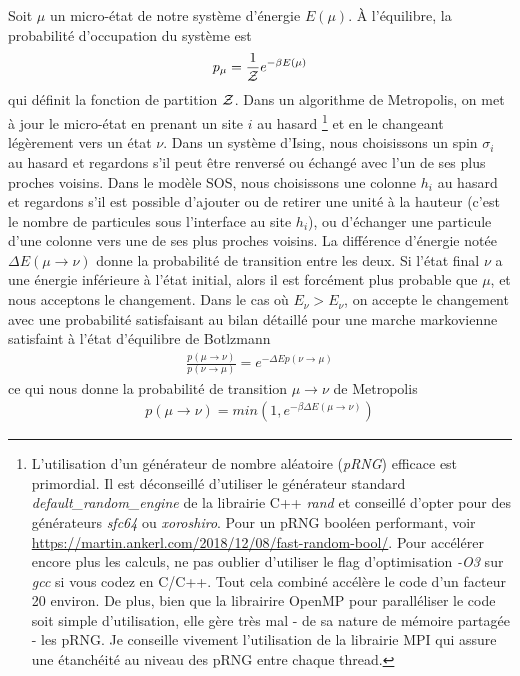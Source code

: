 Soit $\mu$ un micro-état de notre système d'énergie $E(\mu)$. À l'équilibre\cite{gibbs}, la probabilité d'occupation du système est
\begin{align}
	p_\mu = \frac{1}{\mathcal{Z}} e^{-\beta E(\mu)}
\end{align}
qui définit la fonction de partition $\mathcal{Z}$. Dans un algorithme de Metropolis, on met à jour le micro-état en prenant un site $i$ au hasard
\footnote{L'utilisation d'un générateur de nombre aléatoire (\textit{pRNG}) efficace est primordial. Il est déconseillé d'utiliser le générateur standard \textit{default\_random\_engine} de la librairie C++ \textit{rand} et conseillé d'opter pour des générateurs \textit{sfc64} ou \textit{xoroshiro}. Pour un pRNG booléen performant, voir \url{https://martin.ankerl.com/2018/12/08/fast-random-bool/}. Pour accélérer encore plus les calculs, ne pas oublier d'utiliser le flag d'optimisation \textit{-O3}  sur \textit{gcc} si vous codez en C/C++. Tout cela combiné accélère le code d'un facteur 20 environ. \newline
De plus, bien que la librairire OpenMP pour paralléliser le code soit simple d'utilisation, elle gère très mal - de sa nature de mémoire partagée - les pRNG. Je conseille vivement l'utilisation de la librairie MPI qui assure une étanchéité au niveau des pRNG entre chaque thread.} 
et en le changeant légèrement vers un état $\nu$. Dans un système d'Ising, nous choisissons un spin $\sigma_i$ au hasard et regardons s'il peut être renversé ou échangé avec l'un de ses plus proches voisins. Dans le modèle SOS, nous choisissons une colonne $h_i$ au hasard et regardons s'il est possible d'ajouter ou de retirer une unité à la hauteur (c'est le nombre de particules sous l'interface au site $h_i$), ou d'échanger une particule d'une colonne vers une de ses plus proches voisins.
La différence d'énergie notée $\Delta E(\mu \rightarrow \nu)$ donne la probabilité de transition entre les deux. Si l'état final $\nu$ a une énergie inférieure à l'état initial, alors il est forcément plus probable que $\mu$, et nous acceptons le changement. Dans le cas où $E_\nu \greater E_\nu$, on accepte le changement avec une probabilité satisfaisant au bilan détaillé pour une marche markovienne satisfaint à l'état d'équilibre de Botlzmann
\begin{align}
\frac{p(\mu \rightarrow \nu)}{p(\nu \rightarrow \mu)} = e^{-\Delta Ep(\nu \rightarrow \mu)}
\end{align}
ce qui nous donne la probabilité de transition $\mu \to \nu$ de Metropolis
\begin{align}
	p(\mu \rightarrow \nu) = min(1,e^{-\beta \Delta E(\mu \rightarrow \nu)})
\end{align}

